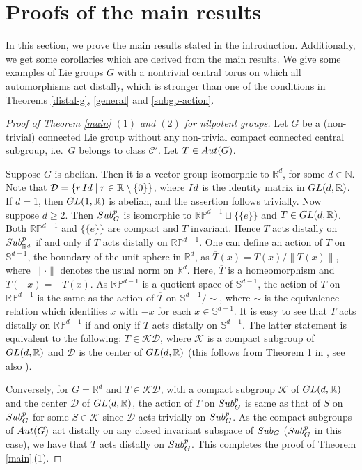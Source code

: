 \documentclass{amsart}
\numberwithin{equation}{section}
\newcommand{\Aut}{{\rm Aut}}
\newcommand{\Sub}{{\rm Sub}}
\newcommand{\mbb}{\mathbb}
\newcommand{\N}{{\mathbb N}}
\newcommand{\R}{{\mathbb R}}
\newcommand{\K}{{\mathcal K}}
\newcommand{\D}{{\mathcal D}}
\newcommand{\RP}{{\mathbb{RP}}}
\newcommand{\spg}{{\rm Sub}^p_G}
\newcommand{\spp}{{\rm Sub}^{p}}
\newcommand{\Id}{{\rm Id}}
\newcommand{\GL}{{\rm GL}}
\let\ol=\overline
\let\mi=\setminus
\theoremstyle{remark}
\newcommand{\cp}{{\mathcal{C}'}}
\begin{document}
\section{Proofs of the main results}

In this section, we prove the main results stated in the introduction. 
Additionally, we get some corollaries which are derived from the main results. We give some examples 
of Lie groups $G$ with a nontrivial central torus on which all automorphisms act distally, 
which is stronger than one of the conditions in Theorems \ref{distal-g}, \ref{general} and \ref{subgp-action}.

\begin{proof}[Proof of Theorem {\rm \ref{main}} $(1)$ and $(2)$ for nilpotent groups] Let $G$ 
be a (non-trivial) connected Lie group without any non-trivial compact connected central subgroup, 
i.e.\ $G$ belongs to class $\cp$. Let $T\in\Aut(G)$.

\smallskip
{} Suppose $G$ is abelian. Then it is a vector group isomorphic to $\R^d$, 
for some $d\in\N$. Note that $\D=\{r\,\Id\mid r\in\R\mi\{0\}\}$, where $\Id$ is the identity matrix in $\GL(d,\R)$. 
If $d=1$, then $\GL(1,\R)$ is abelian, and the assertion follows trivially. Now suppose $d\ge 2$. Then $\spg$ 
is isomorphic to $\mbb {RP}^{d-1} \sqcup \{\{e\}\}$ and $T\in \GL(d,\R)$. 
Both $\mbb { RP}^{d-1}$ and $\{\{e\}\}$ are compact and $T$ invariant. 
Hence $T$ acts distally on $\spp_{\R^d}$ if and only if $T$ acts distally on $\mbb{RP}^{d-1}$. 
One can define an action of $T$ on $\mbb S^{d-1}$, the 
boundary of the unit sphere in $\R^d$, as $\ol{T}(x)=T(x)/\|T(x)\|$, where $\|\cdot\|$ denotes the 
usual norm on $\R^d$. Here, $\ol{T}$ is a homeomorphism and $\ol{T}(-x)= -\ol{T}(x)$. 
As $\RP^{d-1}$ is a quotient space of $\mbb S^{d-1}$, 
the action of $T$ on $\RP^{d-1}$ is the same as the action of $\ol{T}$ on 
${\mbb S}^{d-1}/\sim$, where $\sim$ is the equivalence relation which identifies  
$x$ with $-x$ for each $x\in \mbb S^{d-1}$. It is easy to see that $T$ acts distally 
on $\RP^{d-1}$ if and only if $\ol{T}$ acts distally on $\mbb S^{d-1}$. 
The latter statement is equivalent to the following: $T \in \K \D$, where $\K$ is a 
compact subgroup of $\GL(d,\R)$ and $\D$ is the center of $\GL(d,\R)$  
(this follows from Theorem 1 in \cite{SY1}, see also \cite{SY4}). 

Conversely, for $G=\R^d$ and $T\in \K\D$, with a compact subgroup $\K$ of $\GL(d,\R)$ and the center 
$\D$ of $\GL(d,\R)$, the action of $T$ on $\spg$ is same as that of $S$ on $\spg$ for some $S\in\K$ 
since $\D$ acts trivially on $\spg$. As the compact subgroups of $\Aut(G)$ act distally on any closed 
invariant subspace of $\Sub_G$ ($\spg$ in this case), we have that $T$ acts distally on $\spg$. 
This completes the proof of Theorem \ref{main}\,(1). 


\end{proof}
\end{document}

